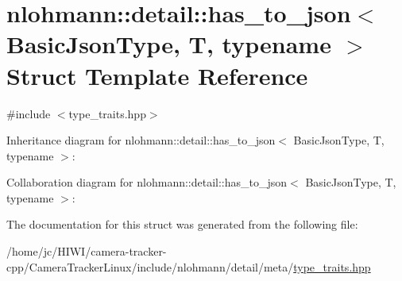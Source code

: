 \hypertarget{structnlohmann_1_1detail_1_1has__to__json}{}\section{nlohmann\+:\+:detail\+:\+:has\+\_\+to\+\_\+json$<$ Basic\+Json\+Type, T, typename $>$ Struct Template Reference}
\label{structnlohmann_1_1detail_1_1has__to__json}


{\ttfamily \#include $<$type\+\_\+traits.\+hpp$>$}



Inheritance diagram for nlohmann\+:\+:detail\+:\+:has\+\_\+to\+\_\+json$<$ Basic\+Json\+Type, T, typename $>$\+:


Collaboration diagram for nlohmann\+:\+:detail\+:\+:has\+\_\+to\+\_\+json$<$ Basic\+Json\+Type, T, typename $>$\+:


The documentation for this struct was generated from the following file\+:\begin{DoxyCompactItemize}
\item 
/home/jc/\+H\+I\+W\+I/camera-\/tracker-\/cpp/\+Camera\+Tracker\+Linux/include/nlohmann/detail/meta/\hyperlink{type__traits_8hpp}{type\+\_\+traits.\+hpp}\end{DoxyCompactItemize}
